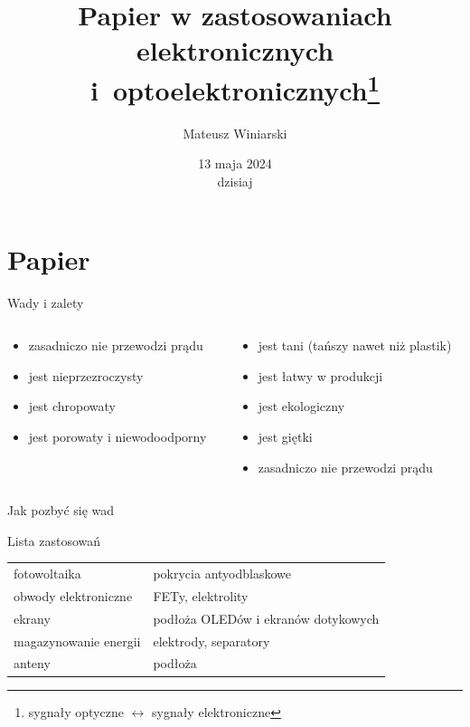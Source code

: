 \documentclass{beamer}
\title[Papier w zastosowaniach elektronicznych i~optoelektronicznych$^1$]{Papier w zastosowaniach elektronicznych i~optoelektronicznych\footnote{sygnały optyczne $\leftrightarrow$ sygnały elektroniczne}}
\author[M. Winiarski]{Mateusz Winiarski}
\institute[fizyk UJ]{fizyka IV-I, WFAIS}
\date[dzisiaj]{13 maja 2024\\dzisiaj}
\begin{document}
\frame{\titlepage}

\section{Papier}
        \begin{frame}{Wady \hfill i \hfill zalety}
\begin{columns}

\begin{column}{0.5\textwidth}
    \begin{itemize}
        \item zasadniczo nie przewodzi prądu
        \item jest nieprzezroczysty
        \item jest chropowaty
        \item jest porowaty i niewodoodporny
    \end{itemize}
\end{column}
\begin{column}{0.5\textwidth}
    \begin{itemize}
        \item jest tani (tańszy nawet niż plastik)
        \item jest łatwy w produkcji
        \item jest ekologiczny
        \item jest giętki
        \item zasadniczo nie przewodzi prądu
    \end{itemize}
    \end{column}
\end{columns}
\end{frame}

\begin{frame}{Jak pozbyć się wad}
    
\end{frame}

\begin{frame}{Lista zastosowań}
\begin{tabular}{@{$\blacktriangleright$ }l @{$\quad\to\quad$ } l}
    fotowoltaika & pokrycia antyodblaskowe \\
    obwody elektroniczne & FETy, elektrolity \\
    ekrany & podłoża OLEDów i ekranów dotykowych \\
    magazynowanie energii & elektrody, separatory \\
    anteny & podłoża \\
\end{tabular}
\end{frame}
\end{document}
